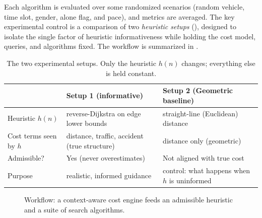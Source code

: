 \documentclass{ai-lab-report}
\begin{document}
Each algorithm is evaluated over some randomized scenarios (random vehicle, time slot, gender, alone flag, and pace), and metrics are averaged. The key experimental control is a comparison of two \emph{heuristic setups} (), designed to isolate the single factor of heuristic informativeness while holding the cost model, queries, and algorithms fixed. The workflow is summarized in .

\begin{table}[H]
\centering
\small
\begin{tabularx}{\linewidth}{@{}lXX@{}}
\toprule
 & \textbf{Setup 1 (informative)} & \textbf{Setup 2 (Geometric baseline)} \\
\midrule
Heuristic $h(n)$ & reverse-Dijkstra on edge lower bounds & straight-line (Euclidean) distance \\
Cost terms seen by $h$ & distance, traffic, accident (true structure) & distance only (geometric) \\
Admissible? & Yes (never overestimates) & Not aligned with true cost \\
Purpose & realistic, informed guidance & control: what happens when $h$ is uninformed \\
\bottomrule
\end{tabularx}
\caption{The two experimental setups. Only the heuristic $h(n)$ changes; everything else is held constant.}
\label{tab:a1setups}
\end{table}

\begin{figure}[H]
  \centering
  \caption{Workflow: a context-aware cost engine feeds an admissible heuristic and a suite of search algorithms.}
  \label{fig:a1workflow}
\end{figure}
\end{document}
